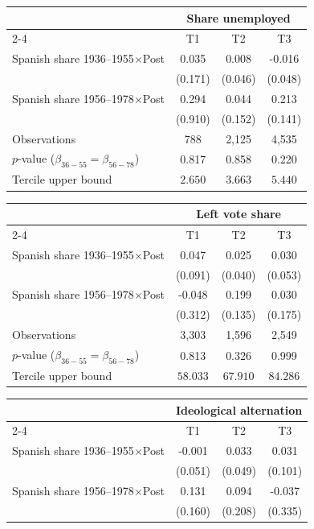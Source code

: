 \begin{table}[!h]
\begin{tabular*}{\textwidth}{l@{\extracolsep{\fill}}ccc}
& \multicolumn{3}{c}{Share unemployed} \\
\cmidrule(l){2-4}
& T1 & T2 & T3 \\
\hline
Spanish share 1936--1955\(\times\)Post & 0.035 & 0.008 & -0.016 \\
 & (0.171) & (0.046) & (0.048) \\
Spanish share 1956--1978\(\times\)Post & 0.294 & 0.044 & 0.213 \\
 & (0.910) & (0.152) & (0.141) \\
\addlinespace
Observations & 788 & 2,125 & 4,535 \\
\(p\)-value (\(\beta_{36{-}55}=\beta_{56{-}78}\)) & 0.817 & 0.858 & 0.220 \\
Tercile upper bound & \(2.650\) & \(3.663\) & \(5.440\) \\
\hline
\end{tabular*}
\begin{tabular*}{\textwidth}{l@{\extracolsep{\fill}}ccc}
& \multicolumn{3}{c}{Left vote share} \\
\cmidrule(l){2-4}
& T1 & T2 & T3 \\
\hline
Spanish share 1936--1955\(\times\)Post & 0.047 & 0.025 & 0.030 \\
 & (0.091) & (0.040) & (0.053) \\
Spanish share 1956--1978\(\times\)Post & -0.048 & 0.199 & 0.030 \\
 & (0.312) & (0.135) & (0.175) \\
\addlinespace
Observations & 3,303 & 1,596 & 2,549 \\
\(p\)-value (\(\beta_{36{-}55}=\beta_{56{-}78}\)) & 0.813 & 0.326 & 0.999 \\
Tercile upper bound & \(58.033\) & \(67.910\) & \(84.286\) \\
\hline
\end{tabular*}
\begin{tabular*}{\textwidth}{l@{\extracolsep{\fill}}ccc}
& \multicolumn{3}{c}{Ideological alternation} \\
\cmidrule(l){2-4}
& T1 & T2 & T3 \\
\hline
Spanish share 1936--1955\(\times\)Post & -0.001 & 0.033 & 0.031 \\
 & (0.051) & (0.049) & (0.101) \\
Spanish share 1956--1978\(\times\)Post & 0.131 & 0.094 & -0.037 \\
 & (0.160) & (0.208) & (0.335) \\

\end{tabular*}
\end{table}
